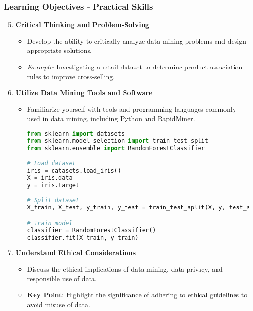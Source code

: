 \documentclass[aspectratio=169]{beamer}
\begin{document}
\begin{frame}[fragile]
    \frametitle{Learning Objectives - Practical Skills}
    \begin{enumerate}
        \setcounter{enumi}{4} %
        \item \textbf{Critical Thinking and Problem-Solving}
        \begin{itemize}
            \item Develop the ability to critically analyze data mining problems and design appropriate solutions.
            \item \textit{Example}: Investigating a retail dataset to determine product association rules to improve cross-selling.
        \end{itemize}
        
        \item \textbf{Utilize Data Mining Tools and Software}
        \begin{itemize}
            \item Familiarize yourself with tools and programming languages commonly used in data mining, including Python and RapidMiner.
            \begin{lstlisting}[language=Python]
from sklearn import datasets
from sklearn.model_selection import train_test_split
from sklearn.ensemble import RandomForestClassifier

# Load dataset
iris = datasets.load_iris()
X = iris.data
y = iris.target

# Split dataset
X_train, X_test, y_train, y_test = train_test_split(X, y, test_size=0.3, random_state=42)

# Train model
classifier = RandomForestClassifier()
classifier.fit(X_train, y_train)
            \end{lstlisting}
        \end{itemize}

        \item \textbf{Understand Ethical Considerations}
        \begin{itemize}
            \item Discuss the ethical implications of data mining, data privacy, and responsible use of data.
            \item \textbf{Key Point}: Highlight the significance of adhering to ethical guidelines to avoid misuse of data.
        \end{itemize}
    \end{enumerate}
\end{frame}
\end{document}
